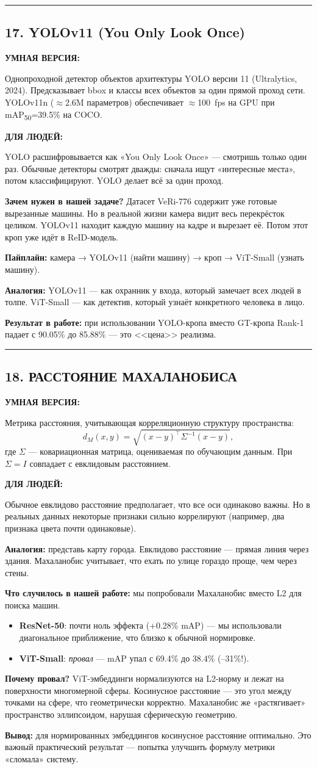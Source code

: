 \documentclass[12pt,a4paper]{article}
\newcommand{\term}[3]{
\noindent\rule{\textwidth}{1pt}
\subsection*{#1}

\textcolor{smartgreen}{\textbf{УМНАЯ ВЕРСИЯ:}}

#2

\vspace{0.5em}
\textcolor{simpleblue}{\textbf{ДЛЯ ЛЮДЕЙ:}}

#3

\vspace{1em}
}
\begin{document}
\term{17. YOLOv11 (You Only Look Once)}
{Однопроходной детектор объектов архитектуры YOLO версии 11 (Ultralytics, 2024). Предсказывает bbox и классы всех объектов за один прямой проход сети. YOLOv11n ($\approx$2.6M параметров) обеспечивает $\approx$100~fps на GPU при mAP\textsubscript{50}=39.5\% на COCO.}
{YOLO расшифровывается как «You Only Look Once» — смотришь только один раз. Обычные детекторы смотрят дважды: сначала ищут «интересные места», потом классифицируют. YOLO делает всё за один проход.

\textbf{Зачем нужен в нашей задаче?} Датасет VeRi-776 содержит уже готовые вырезанные машины. Но в реальной жизни камера видит весь перекрёсток целиком. YOLOv11 находит каждую машину на кадре и вырезает её. Потом этот кроп уже идёт в ReID-модель.

\textbf{Пайплайн:} камера → YOLOv11 (найти машину) → кроп → ViT-Small (узнать машину).

\textbf{Аналогия:} YOLOv11 — как охранник у входа, который замечает всех людей в толпе. ViT-Small — как детектив, который узнаёт конкретного человека в лицо.

\textbf{Результат в работе:} при использовании YOLO-кропа вместо GT-кропа Rank-1 падает с 90.05\% до 85.88\% — это <<цена>> реализма.}

\term{18. РАССТОЯНИЕ МАХАЛАНОБИСА}
{Метрика расстояния, учитывающая корреляционную структуру пространства:
\[
d_M(x, y) = \sqrt{(x-y)^\top \Sigma^{-1} (x-y)},
\]
где $\Sigma$ — ковариационная матрица, оцениваемая по обучающим данным. При $\Sigma = I$ совпадает с евклидовым расстоянием.}
{Обычное евклидово расстояние предполагает, что все оси одинаково важны. Но в реальных данных некоторые признаки сильно коррелируют (например, два признака цвета почти одинаковые).

\textbf{Аналогия:} представь карту города. Евклидово расстояние — прямая линия через здания. Махаланобис учитывает, что ехать по улице гораздо проще, чем через стены.

\textbf{Что случилось в нашей работе:} мы попробовали Махаланобис вместо L2 для поиска машин.
\begin{itemize}
    \item \textbf{ResNet-50}: почти ноль эффекта (+0.28\% mAP) — мы использовали диагональное приближение, что близко к обычной нормировке.
    \item \textbf{ViT-Small}: \emph{провал} — mAP упал с 69.4\% до 38.4\% (–31\%!).
\end{itemize}

\textbf{Почему провал?} ViT-эмбеддинги нормализуются на L2-норму и лежат на поверхности многомерной сферы. Косинусное расстояние — это угол между точками на сфере, что геометрически корректно. Махаланобис же «растягивает» пространство эллипсоидом, нарушая сферическую геометрию.

\textbf{Вывод:} для нормированных эмбеддингов косинусное расстояние оптимально. Это важный практический результат — попытка улучшить формулу метрики «сломала» систему.}
\end{document}
